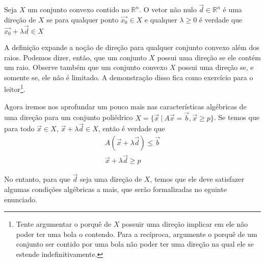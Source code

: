 \begin{def:direção}
	Seja $X$ um conjunto convexo contido no $\mathbb{R}^n$. O vetor não nulo
	$\vec{d} \in \mathbb{R}^n$ é uma direção de $X$ se para qualquer ponto
	$\vec{x_0} \in X$ e qualquer $\lambda \geq 0$ é verdade que
	$\vec{x_0} + \lambda \vec{d} \in X$
\end{def:direção}

A definição expande a noção de direção para qualquer conjunto convexo além dos
raios. Podemos dizer, então, que um conjunto $X$ possui uma direção se ele contém
um raio. Observe também que um conjunto convexo $X$ possui uma direção se, e
somente se, ele não é limitado. A demonstração disso fica como exercício para o
leitor\footnote{Tente argumentar o porquê de $X$ possuir uma direção implicar em
ele não poder ter uma bola o contendo. Para a recíproca, argumente o porquê de
um conjunto ser contido por uma bola não poder ter uma direção na qual ele se
estende indefinitivamente.}.

Agora iremos nos aprofundar um pouco mais nas características algébricas de uma
direção para um conjunto poliédrico $X = \{\vec{x}\ |\ A\vec{x} = \vec{b}, \vec{x} \geq p\}$.
Se temos que para todo $\vec{x} \in X$, $\vec{x} + \lambda \vec{d} \in X$,
então é verdade que
\begin{gather*}
	A (\vec{x} + \lambda \vec{d}) \leq \vec{b} \\
	\vec{x} + \lambda \vec{d} \geq p
\end{gather*}

No entanto, para que $\vec{d}$ seja uma direção de $X$, temos que ele deve
satisfazer algumas condições algébricas a mais, que serão formalizadas no
eguinte enunciado.

